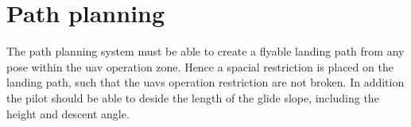 \chapter{Path planning}
The path planning system must be able to create a flyable landing path from any pose within the uav operation zone. Hence a spacial restriction is placed on the landing path, such that the uavs operation restriction are not broken. In addition the pilot should be able to deside the length of the glide slope, including the height and descent angle.
